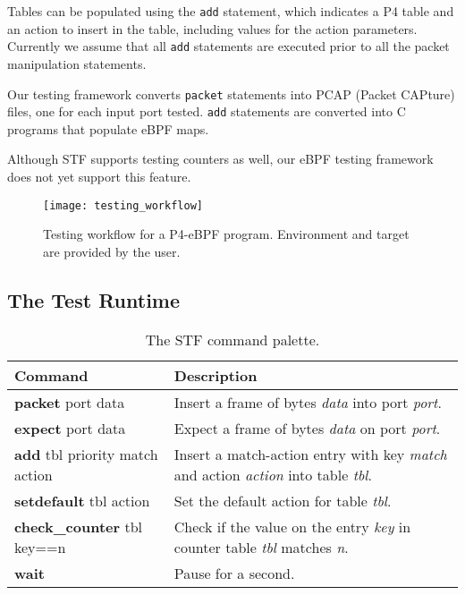 Tables can be populated using the \texttt{add} statement, which
indicates a P4 table and an action to insert in the table, including
values for the action parameters.  Currently we assume that all
\texttt{add} statements are executed prior to all the packet
manipulation statements.

Our testing framework converts \texttt{packet} statements into PCAP
(Packet CAPture) files, one for each input port tested.  \texttt{add}
statements are converted into C programs that populate eBPF maps.

Although STF supports testing counters as well, our eBPF testing
framework does not yet support this feature.

\begin{figure*}
	\centering
	\texttt{[image: testing\_workflow]}
	\caption{Testing workflow for a P4-eBPF program. Environment and
		target are provided by the user.}
	\label{fig:p4_testflow}
\end{figure*}

\subsection{The Test Runtime}

\begin{table}[h]
	\footnotesize
	\begin{center}
		\begin{tabular}{|p{2.8cm}|p{4.3cm}|} \hline
			\textbf{Command} & \textbf{Description} \\ \hline \hline
			\textbf{packet} port data & Insert a frame of bytes
			\textit{data} into port \textit{port}.    \\ \hline
			\textbf{expect} port data & Expect a frame of bytes
			\textit{data} on port \textit{port}.  \\ \hline
			\textbf{add} tbl priority match action & Insert a
			match-action entry with key \textit{match} and action
			\textit{action} into table \textit{tbl}. \\ \hline
			\textbf{setdefault} tbl action & Set the default action for table
			\textit{tbl}. \\
			\hline
			\textbf{check\_counter} tbl key==n & Check if the value on
			the entry \textit{key} in counter table \textit{tbl} matches
			\textit{n}.  \\
			\hline
			\textbf{wait} & Pause for a second. \\ \hline
		\end{tabular}
		\caption{The STF command palette.}\label{table:stf}
	\end{center}
\end{table}

